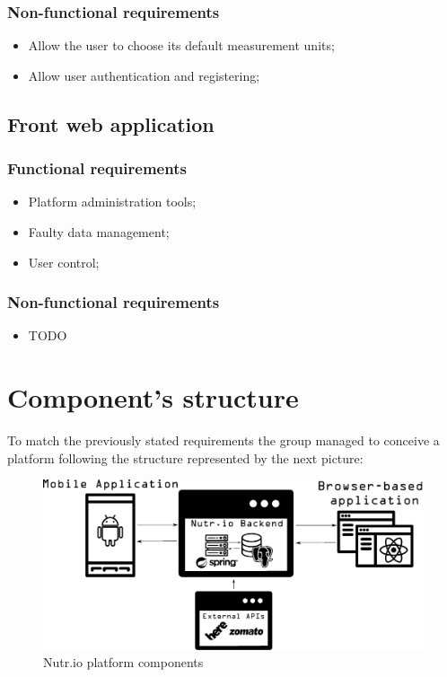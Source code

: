 \subsubsection{Non-functional requirements}

\begin{itemize}
    \item Allow the user to choose its default measurement units;
    \item Allow user authentication and registering;
\end{itemize}

\subsection{Front web application}

\subsubsection{Functional requirements}

\begin{itemize}
    \item Platform administration tools;
    \item Faulty data management;
    \item User control;
\end{itemize}

\subsubsection{Non-functional requirements}

\begin{itemize}
    \item TODO
\end{itemize}

\section{Component's structure}

To match the previously stated requirements the group managed to conceive a platform following the structure
represented by the next picture:\\

\begin{figure}[H]
    \begin{center}
        \includegraphics[scale=0.4]{_figures/Nutrio_components.eps}
        \caption{Nutr.io platform components}
    \end{center}
\end{figure}

